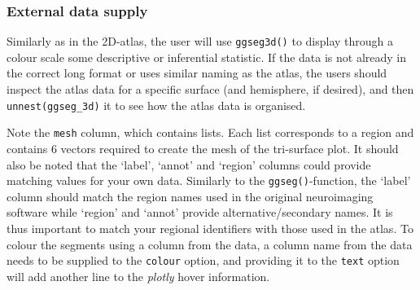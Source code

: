 \documentclass[fleqn,10pt]{wlpeerj} %
\newenvironment{Shaded}{\begin{snugshade}}{\end{snugshade}}
\newcommand{\CommentTok}[1]{\textcolor[rgb]{0.56,0.35,0.01}{\textit{#1}}}
\newcommand{\DecValTok}[1]{\textcolor[rgb]{0.00,0.00,0.81}{#1}}
\newcommand{\KeywordTok}[1]{\textcolor[rgb]{0.13,0.29,0.53}{\textbf{#1}}}
\newcommand{\NormalTok}[1]{#1}
\newcommand{\OperatorTok}[1]{\textcolor[rgb]{0.81,0.36,0.00}{\textbf{#1}}}
\newcommand{\StringTok}[1]{\textcolor[rgb]{0.31,0.60,0.02}{#1}}
\begin{document}
\hypertarget{external-data-supply}{%
\subsubsection{External data supply}\label{external-data-supply}}

Similarly as in the 2D-atlas, the user will use \texttt{ggseg3d()} to display through a colour scale some descriptive or inferential statistic.
If the data is not already in the correct long format or uses similar naming as the atlas, the users should inspect the atlas data for a specific surface (and hemisphere, if desired), and then \texttt{unnest(ggseg\_3d)} it to see how the atlas data is organised.

\small

\begin{Shaded}
\end{Shaded}

\normalsize

Note the \texttt{mesh} column, which contains lists.
Each list corresponds to a region and contains 6 vectors required to create the mesh of the tri-surface plot.
It should also be noted that the `label', `annot' and `region' columns could provide matching values for your own data.
Similarly to the \texttt{ggseg()}-function, the `label' column should match the region names used in the original neuroimaging software while `region' and `annot' provide alternative/secondary names.
It is thus important to match your regional identifiers with those used in the atlas.
To colour the segments using a column from the data, a column name from the data needs to be supplied to the \texttt{colour} option, and providing it to the \texttt{text} option will add another line to the \emph{plotly} hover information.
\end{document}
